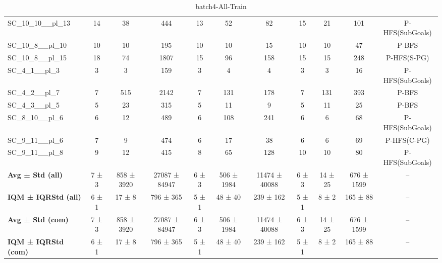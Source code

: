\begin{table}[!ht]
\begin{tabular}{l|ccc|ccc|cccc}
SC\_10\_10\_\_pl\_13 & 14 & 38 & 444 & 13 & 52 & 82 & 15 & 21 & 101 & P-HFS(SubGoals) \\
SC\_10\_8\_\_pl\_10 & 10 & 10 & 195 & 10 & 10 & 15 & 10 & 10 & 47 & P-BFS \\
SC\_10\_8\_\_pl\_15 & 18 & 74 & 1807 & 15 & 96 & 158 & 15 & 15 & 248 & P-HFS(S-PG) \\
SC\_4\_1\_\_pl\_3 & 3 & 3 & 159 & 3 & 4 & 4 & 3 & 3 & 16 & P-HFS(SubGoals) \\
SC\_4\_2\_\_pl\_7 & 7 & 515 & 2142 & 7 & 131 & 178 & 7 & 131 & 393 & P-BFS \\
SC\_4\_3\_\_pl\_5 & 5 & 23 & 315 & 5 & 11 & 9 & 5 & 11 & 25 & P-BFS \\
SC\_8\_10\_\_pl\_6 & 6 & 12 & 489 & 6 & 108 & 241 & 6 & 6 & 68 & P-HFS(SubGoals) \\
SC\_9\_11\_\_pl\_6 & 7 & 9 & 474 & 6 & 17 & 38 & 6 & 6 & 69 & P-HFS(C-PG) \\
SC\_9\_11\_\_pl\_8 & 9 & 12 & 415 & 8 & 65 & 128 & 10 & 10 & 80 & P-HFS(SubGoals) \\
\hline
\textbf{Avg ± Std (all)} & 7 ± 3 & 858 ± 3920 & 27087 ± 84947 & 6 ± 3 & 506 ± 1984 & 11474 ± 40088 & 6 ± 3 & 14 ± 25 & 676 ± 1599 & -- \\
\textbf{IQM ± IQRStd (all)} & 6 ± 1 & 17 ± 8 & 796 ± 365 & 5 ± 1 & 48 ± 40 & 239 ± 162 & 5 ± 1 & 8 ± 2 & 165 ± 88 & -- \\
\textbf{Avg ± Std (com)} & 7 ± 3 & 858 ± 3920 & 27087 ± 84947 & 6 ± 3 & 506 ± 1984 & 11474 ± 40088 & 6 ± 3 & 14 ± 25 & 676 ± 1599 & -- \\
\textbf{IQM ± IQRStd (com)} & 6 ± 1 & 17 ± 8 & 796 ± 365 & 5 ± 1 & 48 ± 40 & 239 ± 162 & 5 ± 1 & 8 ± 2 & 165 ± 88 & -- \\
\end{tabular}
\caption{batch4-All-Train}
\label{tab:batch4_All_comparison_train}
\end{table}
